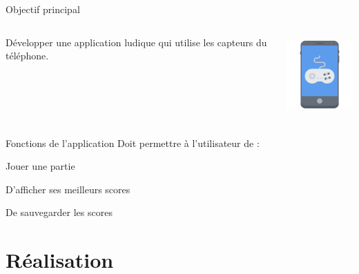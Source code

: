 \documentclass[xcolor=dvipsnames]{beamer}
\begin{document}
\begin{frame}{Objectif principal}
    \begin{columns}[T]
     \begin{column}[c]{5cm}
     \begin{center}
         \Large{Développer une application ludique qui utilise les capteurs du téléphone.}
     \end{center}
     \end{column}
     \begin{column}[c]{5cm}
          \begin{center}\includegraphics[height=3cm]{Images/phone.png} \end{center}
     \end{column}
     \end{columns}
\end{frame}

\begin{frame}{Fonctions de l'application}
    \LARGE{Doit permettre à l'utilisateur de :}
    \vspace{2em}
    \begin{itemize}[label=\textbullet, font=\large \color{color_primary}]
        \Large{
        \item Jouer une partie
        \item D'afficher ses meilleurs scores
        \item De sauvegarder les scores
        }
    \end{itemize}
\end{frame}

\section{Réalisation}
\end{document}
